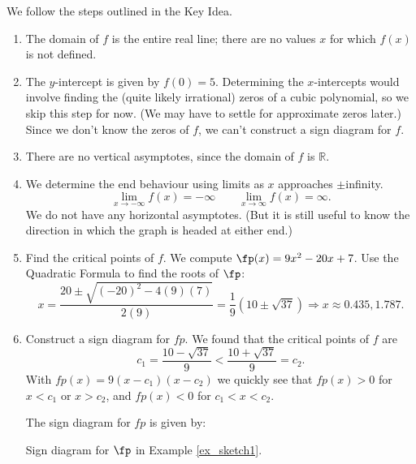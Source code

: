 {We follow the steps outlined in the Key Idea.
\begin{enumerate}
\item		The domain of $f$ is the entire real line; there are no values $x$ for which $f(x)$ is not defined.
\item		The $y$-intercept is given by $f(0)=5$. Determining the $x$-intercepts would involve finding the (quite likely irrational) zeros of a cubic polynomial, so we skip this step for now. (We may have to settle for approximate zeros later.) Since we don't know the zeros of $f$, we can't construct a sign diagram for $f$.
\item		There are no vertical asymptotes, since the domain of $f$ is $\mathbb{R}$.
\item		We determine the end behaviour using limits as $x$ approaches $\pm$infinity.				
\[
\lim_{x\to -\infty} f(x) = -\infty \qquad \lim_{x\to \infty}f(x) = \infty.
\]
			We do not have any horizontal asymptotes. (But it is still useful to know the direction in which the graph is headed at either end.)

\item		Find the critical points of $f$. We compute $\fp(x) = 9x^2-20x+7$. Use the Quadratic Formula to find the roots of $\fp$:
\[
x = \frac{20\pm \sqrt{(-20)^2-4(9)(7)}}{2(9)} = \frac19\left(10\pm\sqrt{37}\right) \Rightarrow x\approx 0.435, 1.787.
\]
\item 		Construct a sign diagram for $fp$. We found that the critical points of $f$ are 
\[
c_1 = \frac{10-\sqrt{37}}{9} < \frac{10+\sqrt{37}}{9} = c_2.
\]
With $fp(x) = 9(x-c_1)(x-c_2)$ we quickly see that $fp(x)>0$ for $x<c_1$ or $x>c_2$, and $fp(x)<0$ for $c_1<x<c_2$.

\pagebreak

The sign diagram for $fp$ is given by:

\noindent\begin{minipage}{\textwidth}
\begin{center}
\end{center}
\captionsetup{type=figure}%
			\caption{Sign diagram for $\fp$ in Example \ref{ex_sketch1}.}\label{fig:sketchline1fp}
\end{minipage}


\end{enumerate}}

